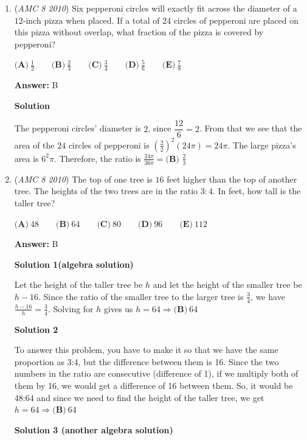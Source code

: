 \begin{enumerate}
	\item (\textit{AMC 8 2010}) Six pepperoni circles will exactly fit across the diameter of a $12$-inch pizza when placed. If a total of $24$ circles of pepperoni are placed on this pizza without overlap, what fraction of the pizza is covered by pepperoni?


 $\textbf{(A)}\ \frac 12 \qquad\textbf{(B)}\ \frac 23 \qquad\textbf{(C)}\ \frac 34 \qquad\textbf{(D)}\ \frac 56 \qquad\textbf{(E)}\ \frac 78$

 \textbf{Answer: }B



\textbf{Solution}

The pepperoni circles' diameter is $2$, since $\dfrac{12}{6} = 2$. From that we see that the area of the $24$ circles of pepperoni is $\left ( \frac{2}{2} \right )^2 (24\pi) = 24\pi$. The large pizza's area is $6^2\pi$. Therefore, the ratio is $\frac{24\pi}{36\pi} = \boxed{\textbf{(B) }\frac{2}{3}}$



	\item (\textit{AMC 8 2010}) The top of one tree is $16$ feet higher than the top of another tree. The heights of the two trees are in the ratio $3:4$. In feet, how tall is the taller tree? 


 $\textbf{(A)}\ 48 \qquad\textbf{(B)}\ 64 \qquad\textbf{(C)}\ 80 \qquad\textbf{(D)}\ 96\qquad\textbf{(E)}\ 112$

 \textbf{Answer: }B



\textbf{Solution 1(algebra solution)}

Let the height of the taller tree be $h$ and let the height of the smaller tree be $h-16$. Since the ratio of the smaller tree to the larger tree is $\frac{3}{4}$, we have $\frac{h-16}{h}=\frac{3}{4}$. Solving for $h$ gives us $h=64 \Rightarrow \boxed{\textbf{(B)}\ 64}$




\textbf{Solution 2}

To answer this problem, you have to make it so that we have the same proportion as 3:4, but the difference between them is 16. Since the two numbers in the ratio are consecutive (difference of 1), if we multiply both of them by 16, we would get a difference of 16 between them. So, it would be 48:64 and since we need to find the height of the taller tree, we get $h=64 \Rightarrow \boxed{\textbf{(B)}\ 64}$




\textbf{Solution 3 (another algebra solution)}


\end{enumerate}
